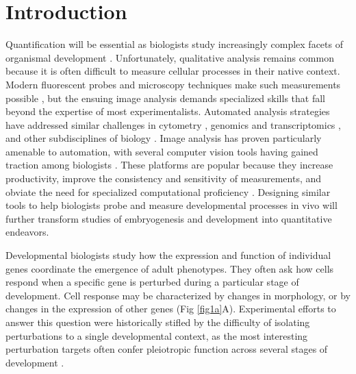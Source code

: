 \documentclass[10pt,letterpaper]{article}
\begin{document}
\section*{Introduction}
Quantification will be essential as biologists study increasingly complex facets of organismal development \cite{Oates2009}. Unfortunately, qualitative analysis remains common because it is often difficult to measure cellular processes in their native context. Modern fluorescent probes and microscopy techniques make such measurements possible \cite{Muzzey2009a,Stelzer2014,Truong2011}, but the ensuing image analysis demands specialized skills that fall beyond the expertise of most experimentalists. Automated analysis strategies have addressed similar challenges in cytometry \cite{Aghaeepour2013,Chen2015,Pyne2009}, genomics and transcriptomics \cite{Bernstein2008,Hellemans2007,Langmead2012,Trapnell2009}, and other subdisciplines of biology \cite{Costes2004,Kelley2015}. Image analysis has proven particularly amenable to automation, with several computer vision tools having gained traction among biologists \cite{Carpenter2006,Paintdakhi2016,Schindelin2012,Sommer2011}. These platforms are popular because they increase productivity, improve the consistency and sensitivity of measurements, and obviate the need for specialized computational proficiency \cite{Jug2014,Sbalzarini2016,Schindelin2015}. Designing similar tools to help biologists probe and measure developmental processes in vivo will further transform studies of embryogenesis and development into quantitative endeavors.

Developmental biologists study how the expression and function of individual genes coordinate the emergence of adult phenotypes. They often ask how cells respond when a specific gene is perturbed during a particular stage of development. Cell response may be characterized by changes in morphology, or by changes in the expression of other genes (Fig \ref{fig1a}A). Experimental efforts to answer this question were historically stifled by the difficulty of isolating perturbations to a single developmental context, as the most interesting perturbation targets often confer pleiotropic function across several stages of development \cite{IanSimpson2002,Parody1993,Shilo1991}. 
\end{document}
